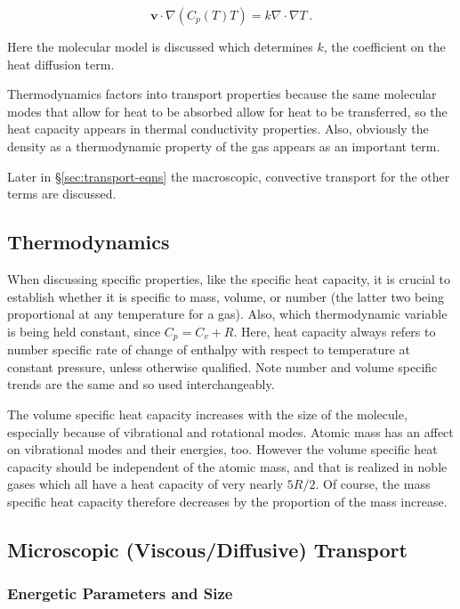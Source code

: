 \documentclass{article}
\begin{document}
\begin{equation}
\mathbf{v} \cdot \nabla (C_p(T) T) = k \nabla \cdot \nabla T \,.
\end{equation} %

Here the molecular model is discussed which determines $k$, the
coefficient on the heat diffusion term.

Thermodynamics factors into transport properties because the same
molecular modes that allow for heat to be absorbed allow for heat to
be transferred, so the heat capacity appears in thermal conductivity
properties. Also, obviously the density as a thermodynamic property of
the gas appears as an important term.

Later in \S\ref{sec:transport-eqns} the macroscopic, convective
transport for the other terms are discussed.

\subsection{Thermodynamics}

When discussing specific properties, like the specific heat capacity,
it is crucial to establish whether it is specific to mass, volume,
or number (the latter two being proportional at any temperature for a
gas). Also, which thermodynamic variable is being held constant, since
$C_p = C_v + R$. Here, heat capacity always refers to number specific
rate of change of enthalpy with respect to temperature at constant
pressure, unless otherwise qualified. Note number and volume specific
trends are the same and so used interchangeably.

The volume specific heat capacity increases with the size of the
molecule, especially because of vibrational and rotational modes. Atomic
mass has an affect on vibrational modes and their energies, too. However
the volume specific heat capacity should be independent of the atomic
mass, and that is realized in noble gases which all have a heat capacity
of very nearly $5R/2$. Of course, the mass specific heat capacity therefore
decreases by the proportion of the mass increase.

\subsection{Microscopic (Viscous/Diffusive) Transport}

\subsubsection{Energetic Parameters and Size}
\end{document}
